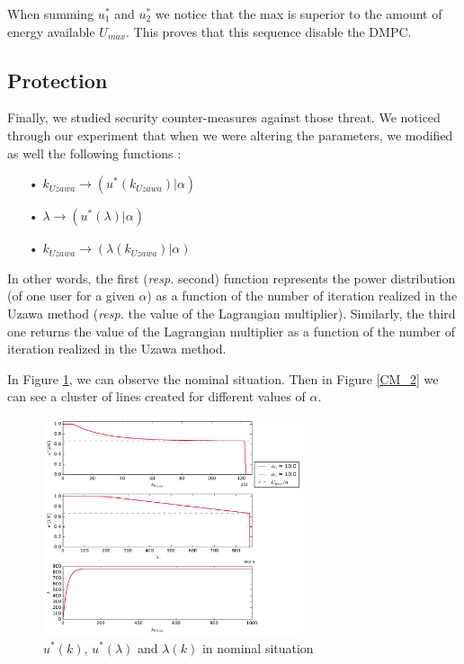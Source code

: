 \documentclass[conference]{IEEEtran}
\begin{document}
When summing $u^*_1$ and $u^*_2$ we notice that the max is superior to the amount of energy available $U_{max}$. This proves that this sequence disable the DMPC. 

\subsection{Protection}
Finally, we studied security counter-measures against those threat. We noticed through our experiment that when we were altering the parameters, we modified as well the following functions :
\begin{itemize}
\item[•] $k_{Uzawa} \rightarrow (u^*(k_{Uzawa}) | \alpha)$
\item[•] $\lambda \rightarrow (u^*(\lambda) | \alpha)$
\item[•] $k_{Uzawa} \rightarrow (\lambda (k_{Uzawa}) | \alpha)$
\end{itemize} 
In other words, the first (\textit{resp.} second) function represents the power distribution (of one user for a given $\alpha$) as a function of the number of iteration realized in the Uzawa method (\textit{resp.} the value of the Lagrangian multiplier). Similarly, the third one returns the value of the Lagrangian multiplier as a function of the number of iteration realized in the Uzawa method. 

In Figure \ref{CM_1}, we can observe the nominal situation. Then in Figure \ref{CM_2} we can see a cluster of lines created for different values of $\alpha$.

\begin{figure}[!t]
\centering
\includegraphics[width=3in]{KL_init.pdf}
\caption{$u^*(k)$, $u^*(\lambda)$ and $\lambda(k)$ in nominal situation}
\label{CM_1}
\end{figure}
\end{document}
